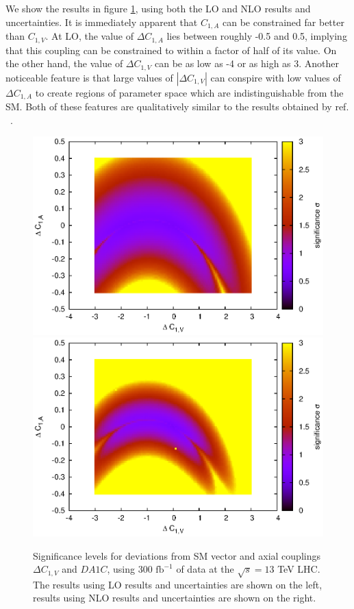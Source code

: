 \documentclass[preprint]{JHEP3} %
\def\invfb {\mathrm{fb}^{-1}}
\def\A1C{C_{1,A}}
\def\V1C{C_{1,V}}
\def\DA1C{\Delta C_{1,A}}
\def\DV1C{\Delta C_{1,V}}
\begin{document}
We show the results in figure \ref{fig:LHC13sigLO}, using both the LO and NLO results and uncertainties. It is immediately apparent that $\A1C$ can be constrained far better than $\V1C$. At LO, the value of $\DA1C$ lies between roughly -0.5 and 0.5, implying that this coupling can be constrained to within a factor of half of its value. On the other hand, the value of $\DV1C$ can be as low as -4 or as high as 3. Another noticeable feature is that large values of $| \DV1C |$ can conspire with low values of $\DA1C$ to create regions of parameter space which are indistinguishable from the SM. Both of these features are qualitatively similar to the results obtained by ref. ~\cite{baur}. 
\begin{figure}
\includegraphics[scale=0.6]{BLLLO1223HSsig_SUA2_300_1.30.eps} 
\includegraphics[scale=0.6]{BLLNLO1223sig_SUA2_300_1.15.eps} 
\caption{Significance levels for deviations from SM vector and axial couplings $\DV1C$ and $DA1C$,  using 300 $\invfb$ of data at the $\sqrt{s}=13$ TeV LHC. The results using LO results and uncertainties are shown on the left, results using NLO results and uncertainties are shown on the right.} \label{fig:LHC13sigLO} 
\end{figure}
\end{document}
